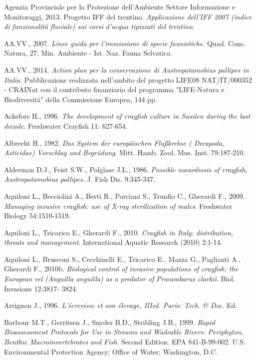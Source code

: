 \documentclass[11pt,a4paper,italian,twoside,openany]{memoir}
\newcommand\BackgroundPicTwo{
  \put(0,0){
    \parbox[b][\paperheight]{\paperwidth}{%
      \vfill
      \centering
      \texttt{[image: 2.pdf]}
      \vfill
    }
  }
}
\newcommand\DeactivateBG{\backgroundsetup{contents={}}}
\begin{document}
\begin{thebibliography}{9}
\DeactivateBG
\AddToShipoutPicture*{\BackgroundPicTwo}
 Agenzia Provinciale per la Protezione dell'Ambiente Settore Informazione e Monitoraggi, 2013. Progetto IFF del trentino. \emph{Applicazione dell'IFF 2007 (indice di funzionalità fluviale) sui corsi d'acqua tipizzati del trentino}.

 AA.VV., 2007. \emph{Linee guida per l'immissione di specie faunistiche}. Quad. Cons. Natura, 27, Min. Ambiente - Ist. Naz. Fauna Selvatica.

 AA.VV., 2014. \emph{Action plan per la conservazione di Austropotamobius pallipes in Italia}. Pubblicazione realizzata nell'ambito del progetto LIFE08 NAT/IT/000352 - CRAINat con il contributo finanziario del programma "LIFE-Natura e Biodiversità" della Commissione Europea,  144 pp.

 Ackefors H., 1996. \emph{The development of crayfish culture in Sweden during the last decade}. Freshwater Crayfish 11: 627-654.

 Albrecht H., 1982. \emph{Das System der europäischen Flußkrebse ( Decapoda, Asticidae) Vorschlag und Begrüdung}. Mitt. Hamb. Zool. Mus. Inst. 79:187‐210.

 Alderman D.J., Feist S.W., Polglase J.L., 1986. \emph{Possible nocardiosis of crayfish, Austropotamobius pallipes}. J. Fish Dis. 9:345-347.

 Aquiloni L., Becciolini A., Berti R., Porciani S., Trunfio C., Gherardi F., 2009. \emph{Managing invasive crayfish: use of X-ray sterilization of males}. Freshwater Biology 54:1510-1519.

 Aquiloni L., Tricarico E., Gherardi F., 2010. \emph{Crayfish in Italy: distribution, threats and management}. International Aquatic Research (2010) 2:1-14. 

 Aquiloni L., Brusconi S., Cecchinelli E., Tricarico E., Mazza G., Paglianti A., Gherardi F., 2010b. \emph{Biological control of invasive populations of crayfish: the European eel (Anguilla anguilla) as a predator of Procambarus clarkii}. Biol. Invasions 12:3817- 3824.

 Arrignon J., 1996. \emph{L'écrevisse et son élevage, IIIed. Paris: Tech. \& Doc}. Ed.

 Barbour M.T., Gerritsen J., Snyder B.D., Stribling J.B., 1999. \emph{Rapid Bioassessment Protocols for Use in Streams and Wadeable Rivers: Periphyton, Benthic Macroinvertebrates and Fish}. Second Edition. EPA 841-B-99-002. U.S. Environmental Protection Agency; Office of Water; Washington, D.C.


\end{thebibliography}
\end{document}

